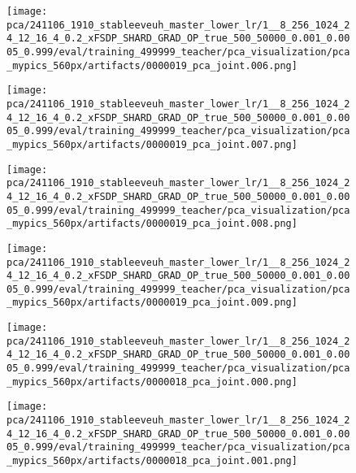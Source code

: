 \begin{figure*}[p]
\begin{subfigure}[t]{0.097\textwidth}
    \end{subfigure}\hfill
    \begin{subfigure}[t]{0.097\textwidth}
        \centering
        \texttt{[image: pca/241106\_1910\_stableeveuh\_master\_lower\_lr/1\_\_8\_256\_1024\_24\_12\_16\_4\_0.2\_xFSDP\_SHARD\_GRAD\_OP\_true\_500\_50000\_0.001\_0.0005\_0.999/eval/training\_499999\_teacher/pca\_visualization/pca\_mypics\_560px/artifacts/0000019\_pca\_joint.006.png]}
    \end{subfigure}\hfill
    \begin{subfigure}[t]{0.097\textwidth}
        \centering
        \texttt{[image: pca/241106\_1910\_stableeveuh\_master\_lower\_lr/1\_\_8\_256\_1024\_24\_12\_16\_4\_0.2\_xFSDP\_SHARD\_GRAD\_OP\_true\_500\_50000\_0.001\_0.0005\_0.999/eval/training\_499999\_teacher/pca\_visualization/pca\_mypics\_560px/artifacts/0000019\_pca\_joint.007.png]}
    \end{subfigure}\hfill
    \begin{subfigure}[t]{0.097\textwidth}
        \centering
        \texttt{[image: pca/241106\_1910\_stableeveuh\_master\_lower\_lr/1\_\_8\_256\_1024\_24\_12\_16\_4\_0.2\_xFSDP\_SHARD\_GRAD\_OP\_true\_500\_50000\_0.001\_0.0005\_0.999/eval/training\_499999\_teacher/pca\_visualization/pca\_mypics\_560px/artifacts/0000019\_pca\_joint.008.png]}
    \end{subfigure}\hfill
    \begin{subfigure}[t]{0.097\textwidth}
        \centering
        \texttt{[image: pca/241106\_1910\_stableeveuh\_master\_lower\_lr/1\_\_8\_256\_1024\_24\_12\_16\_4\_0.2\_xFSDP\_SHARD\_GRAD\_OP\_true\_500\_50000\_0.001\_0.0005\_0.999/eval/training\_499999\_teacher/pca\_visualization/pca\_mypics\_560px/artifacts/0000019\_pca\_joint.009.png]}
    \end{subfigure}
    \begin{subfigure}[t]{0.097\textwidth}
        \centering
        \texttt{[image: pca/241106\_1910\_stableeveuh\_master\_lower\_lr/1\_\_8\_256\_1024\_24\_12\_16\_4\_0.2\_xFSDP\_SHARD\_GRAD\_OP\_true\_500\_50000\_0.001\_0.0005\_0.999/eval/training\_499999\_teacher/pca\_visualization/pca\_mypics\_560px/artifacts/0000018\_pca\_joint.000.png]}
    \end{subfigure}\hfill
    \begin{subfigure}[t]{0.097\textwidth}
        \centering
        \texttt{[image: pca/241106\_1910\_stableeveuh\_master\_lower\_lr/1\_\_8\_256\_1024\_24\_12\_16\_4\_0.2\_xFSDP\_SHARD\_GRAD\_OP\_true\_500\_50000\_0.001\_0.0005\_0.999/eval/training\_499999\_teacher/pca\_visualization/pca\_mypics\_560px/artifacts/0000018\_pca\_joint.001.png]}

\end{subfigure}
\end{figure*}
